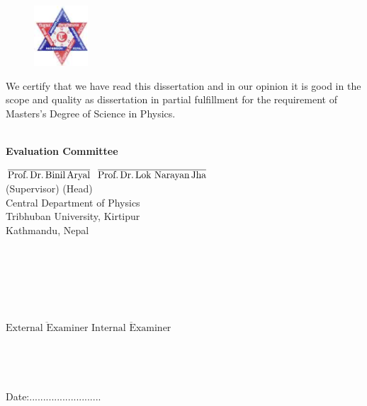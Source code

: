 \thispagestyle{plain}
\newpage
{}
\newpage
\setlength{\topmargin}{0.0cm}

\begin{figure}[h]
\noindent \nonumber
\includegraphics[width=2cm]{logo.eps}
\end{figure}
\vspace{1.75cm}
\noindent We certify that we have read this dissertation and in our opinion
it is good in the scope and quality as dissertation in partial
fulfillment for the requirement
of Masters's Degree of Science in Physics.\\
\\

\begin{center} \large\bf {Evaluation Committee}
\end{center}
\vfill
\vfill \noindent
$\overline{\text{Prof.\,Dr.\,Binil\,Aryal}}$ \hfill $\overline{\text{Prof.\,Dr.\,Lok Narayan\,Jha}}$\\
(Supervisor) \hfill  (Head) \hspace{1cm}\\
\vspace{0.0001cm}\hfill Central Department of Physics\\
 \vspace{0.0001cm}\hfill  Tribhuban University, Kirtipur\\
 \vspace{0.0001cm}\hfill  Kathmandu, Nepal\\
\\
\\
\\
\\
\\
\\
\vspace{1cm} \noindent
{$\overline{\text{External}\,\,\text{Examiner}}$}  \hfill $\overline{\text{Internal}\,\,\text{Examiner}}$\\
\\
\\
\\
\\
Date:..........................
